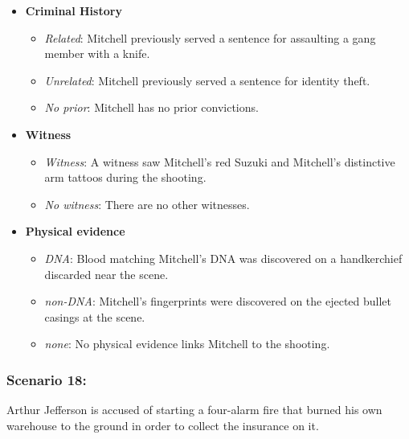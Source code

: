 \documentclass[
]{article}
\providecommand{\tightlist}{%
  \setlength{\itemsep}{0pt}\setlength{\parskip}{0pt}}
\begin{document}
\begin{itemize}
\tightlist
\item
  \textbf{Criminal History}

  \begin{itemize}
  \tightlist
  \item
    \emph{Related}: Mitchell previously served a sentence for assaulting
    a gang member with a knife.
  \item
    \emph{Unrelated}: Mitchell previously served a sentence for identity
    theft.
  \item
    \emph{No prior}: Mitchell has no prior convictions.
  \end{itemize}
\item
  \textbf{Witness}

  \begin{itemize}
  \tightlist
  \item
    \emph{Witness}: A witness saw Mitchell's red Suzuki and Mitchell's
    distinctive arm tattoos during the shooting.
  \item
    \emph{No witness}: There are no other witnesses.
  \end{itemize}
\item
  \textbf{Physical evidence}

  \begin{itemize}
  \tightlist
  \item
    \emph{DNA}: Blood matching Mitchell's DNA was discovered on a
    handkerchief discarded near the scene.
  \item
    \emph{non-DNA}: Mitchell's fingerprints were discovered on the
    ejected bullet casings at the scene.
  \item
    \emph{none}: No physical evidence links Mitchell to the shooting.
  \end{itemize}
\end{itemize}

\hypertarget{scenario-18}{%
\subsubsection{Scenario 18:}\label{scenario-18}}

Arthur Jefferson is accused of starting a four-alarm fire that burned
his own warehouse to the ground in order to collect the insurance on it.
\end{document}

